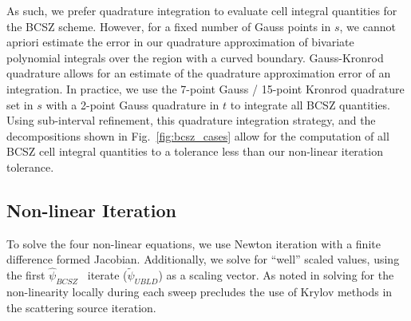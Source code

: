 \documentclass{mc2015}
\newcommand{\fig}[1]{Fig.~\ref{#1}}                      %
\newcommand{\BCSZH}{\ensuremath{\widehat{\psi}_{BCSZ}}}
\begin{document}
As such, we prefer quadrature integration to evaluate cell integral quantities for the BCSZ scheme.
However, for a fixed number of Gauss points in $s$, we cannot apriori estimate the error in our quadrature approximation of bivariate polynomial integrals over the region with a curved boundary.
Gauss-Kronrod quadrature \cite{gk_quad} allows for an estimate of the quadrature approximation error of an integration.
In practice, we use the 7-point Gauss / 15-point Kronrod quadrature set in $s$ with a 2-point Gauss quadrature in $t$ to integrate all BCSZ quantities.
Using  sub-interval refinement, this quadrature integration strategy, and the decompositions shown in \fig{fig:bcsz_cases} allow for the computation of all BCSZ cell integral quantities to a tolerance less than our non-linear iteration tolerance.

\subsection{Non-linear Iteration}
To solve the four non-linear equations, we use Newton iteration with a finite difference formed Jacobian.
Additionally, we solve for ``well'' scaled values, using the first \BCSZH~ iterate ($\widetilde{\psi}_{UBLD}$) as a scaling vector.
As noted in \cite{csz_me,csz_don} solving for the non-linearity locally during each sweep precludes the use of Krylov methods in the scattering source iteration.
\end{document}

